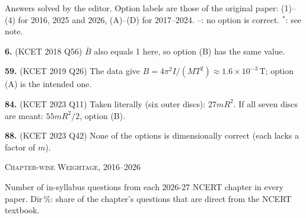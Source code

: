 {\footnotesize Answers solved by the editor. Option labels are those of the original paper: (1)--(4) for 2016, 2025 and 2026, (A)--(D) for 2017--2024. --: no option is correct. $^{*}$: see note.
\par\smallskip\textbf{6.} (KCET 2018 Q56) $\bar B$ also equals 1 here, so option (B) has the same value.
\par\smallskip\textbf{59.} (KCET 2019 Q26) The data give $B = 4\pi^2 I/(MT^2) \approx 1.6\times10^{-3}$\,T; option (A) is the intended one.
\par\smallskip\textbf{84.} (KCET 2023 Q11) Taken literally (six outer discs): $27mR^2$. If all seven discs are meant: $55mR^2/2$, option (B).
\par\smallskip\textbf{88.} (KCET 2023 Q42) None of the options is dimensionally correct (each lacks a factor of $m$).
}\par
\par{}\par
\clearpage\gdef\curyear{Overall Summary}
\label{coverall}
\begin{center}{}\par
{\fontsize{20}{24}\selectfont\color{navy}\scshape Chapter-wise Weightage, 2016--2026}\par
{\color{gilt}}\end{center}
\vspace{2pt}
{\small Number of in-syllabus questions from each 2026-27 NCERT chapter in every paper. Dir\,\%: share of the chapter's questions that are direct from the NCERT textbook.}\par\medskip
